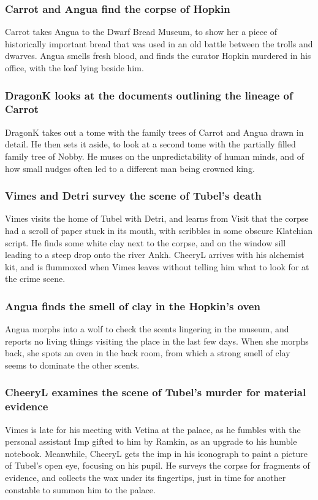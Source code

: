 \subsubsection{\Gls{Carrot} and \Gls{Angua} find the corpse of \Gls{Hopkin}}
\Gls{Carrot} takes \Gls{Angua} to the Dwarf Bread Museum, to show her a piece of historically
important bread that was used in an old battle between the trolls and dwarves. \Gls{Angua} smells
fresh blood, and finds the curator \Gls{Hopkin} murdered in his office, with the loaf lying beside
him.

\subsubsection{\Gls{DragonK} looks at the documents outlining the lineage of \Gls{Carrot}}
\Gls{DragonK} takes out a tome with the family trees of \Gls{Carrot} and \Gls{Angua} drawn in
detail. He then sets it aside, to look at a second tome with the partially filled family tree of
\Gls{Nobby}. He muses on the unpredictability of human minds, and of how small nudges often led to
a different man being crowned king.

\subsubsection{\Gls{Vimes} and \Gls{Detri} survey the scene of \Gls{Tubel}'s death}
\Gls{Vimes} visits the home of \Gls{Tubel} with \Gls{Detri}, and learns from \Gls{Visit} that the
corpse had a scroll of paper stuck in its mouth, with scribbles in some obscure Klatchian script.
He finds some white clay next to the corpse, and on the window sill leading to a steep drop onto the
river Ankh. \Gls{CheeryL} arrives with his alchemist kit, and is flummoxed when \Gls{Vimes} leaves
without telling him what to look for at the crime scene.

\subsubsection{\Gls{Angua} finds the smell of clay in the \Gls{Hopkin}'s oven}
\Gls{Angua} morphs into a wolf to check the scents lingering in the museum, and reports no living
things visiting the place in the last few days. When she morphs back, she spots an oven in the back
room, from which a strong smell of clay seems to dominate the other scents.

\subsubsection{\Gls{CheeryL} examines the scene of \Gls{Tubel}'s murder for material evidence}
\Gls{Vimes} is late for his meeting with \Gls{Vetina} at the palace, as he fumbles with the personal
assistant Imp gifted to him by \Gls{Ramkin}, as an upgrade to his humble notebook. Meanwhile,
\Gls{CheeryL} gets the imp in his iconograph to paint a picture of \Gls{Tubel}'s open eye, focusing
on his pupil. He surveys the corpse for fragments of evidence, and collects the wax under its
fingertips, just in time for another constable to summon him to the palace.

